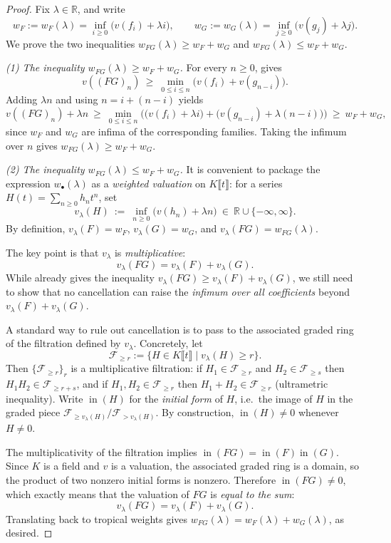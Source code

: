 \begin{proof}
 
  Fix $\lambda\in\mathbb{R}$, and write
  \[
    w_F := w_F(\lambda)=\inf_{i\ge 0}\big(v(f_i)+\lambda i\big),\qquad
    w_G := w_G(\lambda)=\inf_{j\ge 0}\big(v(g_j)+\lambda j\big).
  \]
  We prove the two inequalities $w_{FG}(\lambda)\ge w_F+w_G$ and $w_{FG}(\lambda)\le w_F+w_G$.

  \emph{(1) The inequality $w_{FG}(\lambda)\ge w_F+w_G$.}
  For every $n\ge 0$,  gives
  \[
    v((FG)_n)\ \ge\ \min_{0\le i\le n}\big(v(f_i)+v(g_{n-i})\big).
  \]
  Adding $\lambda n$ and using $n=i+(n-i)$ yields
  \[
    v((FG)_n)+\lambda n\ \ge\
    \min_{0\le i\le n}\Big(\big(v(f_i)+\lambda i\big)+\big(v(g_{n-i})+\lambda(n-i)\big)\Big)
    \ \ge\ w_F+w_G,
  \]
  since $w_F$ and $w_G$ are infima of the corresponding families.
  Taking the infimum over $n$ gives $w_{FG}(\lambda)\ge w_F+w_G$.

  \emph{(2) The inequality $w_{FG}(\lambda)\le w_F+w_G$.}
  It is convenient to package the expression $w_\bullet(\lambda)$ as a \emph{weighted valuation} on $K\llbracket t\rrbracket$:
  for a series $H(t)=\sum_{n\ge 0} h_n t^n$, set
  \[
    v_\lambda(H)\ :=\ \inf_{n\ge 0}\big(v(h_n)+\lambda n\big)\ \in\ \mathbb{R}\cup\{-\infty,\infty\}.
  \]
  By definition, $v_\lambda(F)=w_F$, $v_\lambda(G)=w_G$, and $v_\lambda(FG)=w_{FG}(\lambda)$.

  The key point is that $v_\lambda$ is \emph{multiplicative}:
  \[
    v_\lambda(FG)=v_\lambda(F)+v_\lambda(G).
  \]
  While  already gives the inequality $v_\lambda(FG)\ge v_\lambda(F)+v_\lambda(G)$,
  we still need to show that no cancellation can raise the \emph{infimum over all coefficients} beyond $v_\lambda(F)+v_\lambda(G)$.

  A standard way to rule out cancellation is to pass to the associated graded ring of the filtration defined by $v_\lambda$.
  Concretely, let
  \[
    \mathcal{F}_{\ge r}:=\{H\in K\llbracket t\rrbracket \mid v_\lambda(H)\ge r\}.
  \]
  Then $\{\mathcal{F}_{\ge r}\}_r$ is a multiplicative filtration:
  if $H_1\in\mathcal{F}_{\ge r}$ and $H_2\in\mathcal{F}_{\ge s}$ then $H_1H_2\in\mathcal{F}_{\ge r+s}$,
  and if $H_1,H_2\in\mathcal{F}_{\ge r}$ then $H_1+H_2\in\mathcal{F}_{\ge r}$ (ultrametric inequality).
  Write $\operatorname{in}(H)$ for the \emph{initial form} of $H$, i.e.\ the image of $H$ in the graded piece
  $\mathcal{F}_{\ge v_\lambda(H)}/\mathcal{F}_{> v_\lambda(H)}$.
  By construction, $\operatorname{in}(H)\neq 0$ whenever $H\neq 0$.

  The multiplicativity of the filtration implies $\operatorname{in}(FG)=\operatorname{in}(F)\operatorname{in}(G)$.
  Since $K$ is a field and $v$ is a valuation, the associated graded ring is a domain, so the product
  of two nonzero initial forms is nonzero.
  Therefore $\operatorname{in}(FG)\neq 0$, which exactly means that the valuation of $FG$ is \emph{equal to the sum}:
  \[
    v_\lambda(FG)=v_\lambda(F)+v_\lambda(G).
  \]
  Translating back to tropical weights gives $w_{FG}(\lambda)=w_F(\lambda)+w_G(\lambda)$, as desired.
\end{proof}

